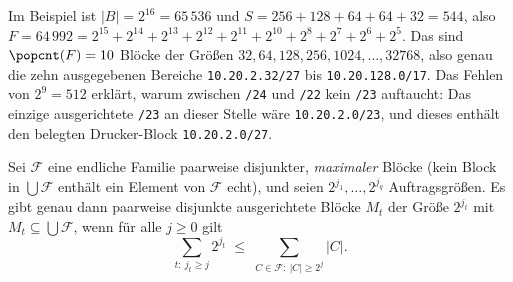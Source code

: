 \begin{beispiel}
	Im Beispiel ist $|B| = 2^{16} = 65\,536$ und $S = 256 + 128 + 64 + 64 + 32 = 544$, also $F = 64\,992 = 2^{15}+2^{14}+2^{13}+2^{12}+2^{11}+2^{10}+2^{8}+2^{7}+2^{6}+2^{5}$. Das sind $\popcnt(F) = 10$ Blöcke der Größen $32,64,128,256,1024,\ldots,32768$, also genau die zehn ausgegebenen Bereiche \texttt{10.20.2.32/27} bis \texttt{10.20.128.0/17}. Das Fehlen von $2^9 = 512$ erklärt, warum zwischen \texttt{/24} und \texttt{/22} kein \texttt{/23} auftaucht: Das einzige ausgerichtete \texttt{/23} an dieser Stelle wäre \texttt{10.20.2.0/23}, und dieses enthält den belegten Drucker-Block \texttt{10.20.2.0/27}.
\end{beispiel}

\begin{satz}[Packbarkeit]
\label{satz:pack}
	Sei $\mathcal{F}$ eine endliche Familie paarweise disjunkter, \emph{maximaler} Blöcke (kein Block in $\bigcup\mathcal{F}$ enthält ein Element von $\mathcal{F}$ echt), und seien $2^{j_1},\ldots,2^{j_q}$ Auftragsgrößen. Es gibt genau dann paarweise disjunkte ausgerichtete Blöcke $M_t$ der Größe $2^{j_t}$ mit $M_t \subseteq \bigcup\mathcal{F}$, wenn für alle $j \ge 0$ gilt
	\[
	\sum_{t:\ j_t \ge j} 2^{j_t} \;\le\; \sum_{C\in\mathcal{F}:\ |C|\ge 2^j} |C|. \tag{$\ast$}
	\]
\end{satz}

